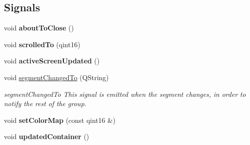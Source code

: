 \subsection*{Signals}
\begin{DoxyCompactItemize}
\item 
\mbox{\label{classScreen__manager_acafc9314a77776acab7fafdca98c8aa6}} 
void {\bfseries about\+To\+Close} ()
\item 
\mbox{\label{classScreen__manager_a50d14535914f456dd55feeb2f54607f5}} 
void {\bfseries scrolled\+To} (qint16)
\item 
\mbox{\label{classScreen__manager_a98ea0e9ea89f3e457b000b6cbabaa9d9}} 
void {\bfseries active\+Screen\+Updated} ()
\item 
\mbox{\label{classScreen__manager_add6968bd7e6bedd1fe0d56e41e80a9d3}} 
void \mbox{\hyperlink{classScreen__manager_add6968bd7e6bedd1fe0d56e41e80a9d3}{segment\+Changed\+To}} (Q\+String)
\begin{DoxyCompactList}\small\item\em segment\+Changed\+To This signal is emitted when the segment changes, in order to notify the rest of the group. \end{DoxyCompactList}\item 
\mbox{\label{classScreen__manager_af30611f6463cf716bfe68d235a6884b2}} 
void {\bfseries set\+Color\+Map} (const qint16 \&)
\item 
\mbox{\label{classScreen__manager_aa3779d6d7f3df9fcae204edb6bd03425}} 
void {\bfseries updated\+Container} ()
\end{DoxyCompactItemize}
